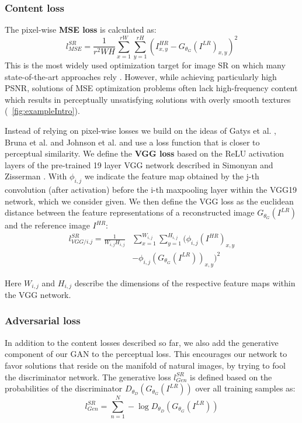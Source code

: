 \documentclass[10pt,twocolumn,letterpaper]{article}
\begin{document}
\subsubsection{Content loss}

The pixel-wise \textbf{\ac{MSE} loss} is calculated as:
\begin{equation}
	l^{SR}_{MSE} = \frac{1}{r^2WH} \sum_{x=1}^{rW} \sum_{y=1}^{rH} (I^{HR}_{x,y} - G_{\theta_G}(I^{LR})_{x,y})^2
\end{equation}
This is the most widely used optimization target for image \ac{SR} on which many state-of-the-art approaches rely \cite{dong2016image,Shi2016ESPCN}. However, while achieving particularly high \ac{PSNR}, solutions of \ac{MSE} optimization problems often lack high-frequency content which results in perceptually unsatisfying solutions with overly smooth textures (\cf \figurename~\ref{fig:exampleIntro}).

Instead of relying on pixel-wise losses we build on the ideas of Gatys et al. \cite{Gatys2015nips}, Bruna et al. \cite{bruna2016super} and Johnson et al. \cite{Johnson16PercepLoss} and use a loss function that is closer to perceptual similarity. We define the \textbf{VGG loss} based on the ReLU activation layers of the pre-trained 19 layer VGG network described in Simonyan and Zisserman \cite{simonyan2014very}. With $\phi_{i,j}$ we indicate the feature map obtained by the j-th convolution (after activation) before the i-th maxpooling layer within the VGG19 network, which we consider given.
	We then define the VGG loss as the euclidean distance between the feature representations of a reconstructed image $G_{\theta_G}(I^{LR})$ and the reference image $I^{HR}$:
	\begin{equation}
	\begin{split}
	l^{SR}_{VGG/i.j} =
	\frac{1}{W_{i,j}H_{i,j}} & \sum_{x=1}^{W_{i,j}} \sum_{y=1}^{H_{i,j}} (\phi_{i,j}(I^{HR})_{x,y} \\
	& - \phi_{i,j}(G_{\theta_G}(I^{LR}))_{x,y})^2	
	\end{split}
	\label{eq:vgg}
	\end{equation}

Here $W_{i,j}$ and $H_{i,j}$ describe the dimensions of the respective feature maps within the VGG network.

\subsubsection{Adversarial loss}
In addition to the content losses described so far, we also add the generative component of our \ac{GAN} to the perceptual loss. This encourages our network to favor solutions that reside on the manifold of natural images, by trying to fool the discriminator network. The generative loss $l^{SR}_{Gen}$ is defined based on the probabilities of the discriminator $D_{\theta_D}(G_{\theta_G}(I^{LR}))$ over all training samples as:
\begin{equation}
	l^{SR}_{Gen} = \sum_{n=1}^{N} -\log D_{\theta_D}(G_{\theta_G}(I^{LR}))
\end{equation}
\end{document}
